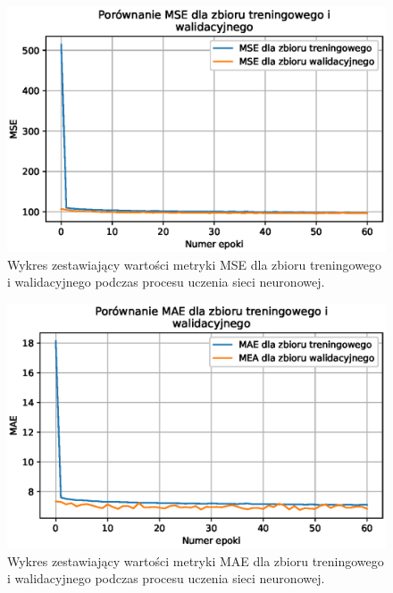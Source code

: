 \documentclass[a4paper,11pt]{article}
\begin{document}
    \begin{figure}[H]
        \label{fig:f_m_mse_train_valid}
        \centering
        \includegraphics[width=\textwidth]{f_m_mse_train_valid}
        \caption{Wykres zestawiający wartości metryki MSE dla zbioru treningowego i walidacyjnego podczas procesu uczenia sieci neuronowej.}
    \end{figure}

    \bigskip

    \begin{figure}[H]
        \label{fig:f_m_mae_train_valid}
        \centering
        \includegraphics[width=\textwidth]{f_m_mae_train_valid}
        \caption{Wykres zestawiający wartości metryki MAE dla zbioru treningowego i walidacyjnego podczas procesu uczenia sieci neuronowej.}
    \end{figure}

    \bigskip
\end{document}
